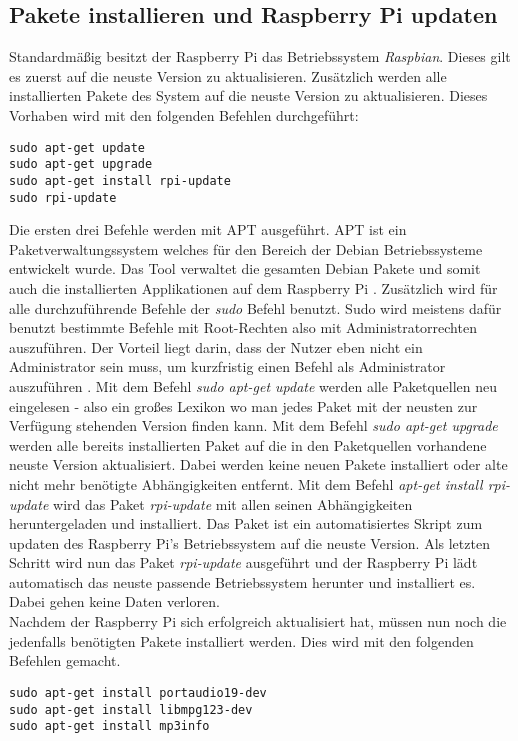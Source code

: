 \subsection{Pakete installieren und Raspberry Pi updaten}
Standardmäßig besitzt der Raspberry Pi das Betriebssystem \textit{Raspbian}. Dieses gilt es zuerst auf die neuste Version zu aktualisieren. Zusätzlich werden alle installierten Pakete des System auf die neuste Version zu aktualisieren. Dieses Vorhaben wird mit den folgenden Befehlen durchgeführt:
\begin{lstlisting}
sudo apt-get update 
sudo apt-get upgrade 
sudo apt-get install rpi-update 
sudo rpi-update
\end{lstlisting}
Die ersten drei Befehle werden mit \ac{APT} ausgeführt. \ac{APT} ist ein Paketverwaltungssystem welches für den Bereich der Debian Betriebssysteme entwickelt wurde. Das Tool verwaltet die gesamten Debian Pakete und somit auch die installierten Applikationen auf dem Raspberry Pi \autocite{apt-debian-wiki_2019}.
Zusätzlich wird für alle durchzuführende Befehle der \textit{sudo} Befehl benutzt. \ac{Sudo} wird meistens dafür benutzt bestimmte Befehle mit Root-Rechten also mit Administratorrechten auszuführen. Der Vorteil liegt darin, dass der Nutzer eben nicht ein Administrator sein muss, um kurzfristig einen Befehl als Administrator auszuführen \autocite{moeller_2013}.
Mit dem Befehl \textit{sudo apt-get update} werden alle Paketquellen neu eingelesen - also ein großes Lexikon wo man jedes Paket mit der neusten zur Verfügung stehenden Version finden kann.
Mit dem Befehl \textit{sudo apt-get upgrade} werden alle bereits installierten Paket auf die in den Paketquellen vorhandene neuste Version aktualisiert. Dabei werden keine neuen Pakete installiert oder alte nicht mehr benötigte Abhängigkeiten entfernt. \autocite{apt-get-wiki_2019}
Mit dem Befehl \textit{apt-get install rpi-update} wird das Paket \textit{rpi-update} mit allen seinen Abhängigkeiten heruntergeladen und installiert. Das Paket ist ein automatisiertes Skript zum updaten des Raspberry Pi's Betriebssystem auf die neuste Version.
Als letzten Schritt wird nun das Paket \textit{rpi-update} ausgeführt und der Raspberry Pi lädt automatisch das neuste passende Betriebssystem herunter und installiert es. Dabei gehen keine Daten verloren.
\\
Nachdem der Raspberry Pi sich erfolgreich aktualisiert hat, müssen nun noch die jedenfalls benötigten Pakete installiert werden. Dies wird mit den folgenden Befehlen gemacht.
\begin{lstlisting}
sudo apt-get install portaudio19-dev
sudo apt-get install libmpg123-dev
sudo apt-get install mp3info 
\end{lstlisting}

